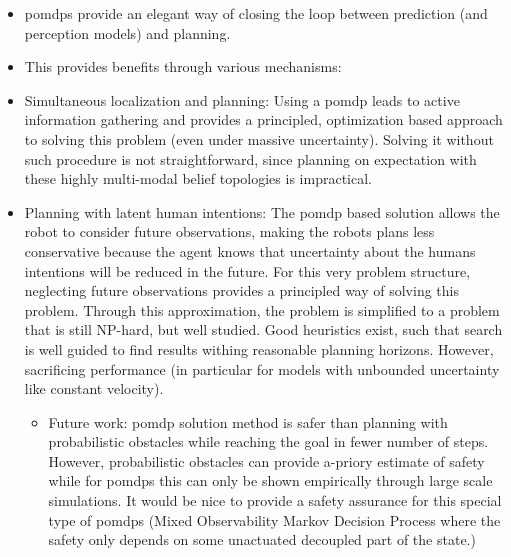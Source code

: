 \begin{itemize}
  \item \acp{pomdp} provide an elegant way of closing the loop between
    prediction (and perception models) and planning.
  \item This provides benefits through various mechanisms:
  \item Simultaneous localization and planning: Using a \ac{pomdp} leads to active
    information gathering and provides a principled, optimization based
    approach to solving this problem (even under massive uncertainty). Solving
    it without such procedure is not straightforward, since planning on expectation
    with these highly multi-modal belief topologies is impractical.
  \item Planning with latent human intentions: The \ac{pomdp} based solution
    allows the robot to consider future observations, making the robots plans
    less conservative because the agent knows that uncertainty about the humans intentions
    will be reduced in the future. For this very problem structure, neglecting future observations
    provides a principled way of solving this problem. Through this
    approximation, the problem is simplified to a problem that is still
    NP-hard, but well studied. Good heuristics exist, such that search is well guided to find results
    withing reasonable planning horizons. However, sacrificing performance (in
    particular for models with unbounded uncertainty like constant velocity).
    \begin{itemize}
      \item Future work: \ac{pomdp} solution method is safer than planning with
      probabilistic obstacles while reaching the goal in fewer number of steps.
      However, probabilistic obstacles can provide a-priory estimate of safety
      while for \acp{pomdp} this can only be shown empirically through large
      scale simulations. It would be nice to provide a safety assurance for
      this special type of \acp{pomdp} (Mixed Observability Markov Decision
      Process where the safety only depends on some unactuated decoupled part
      of the state.)
    \end{itemize}
\end{itemize}
\fi
